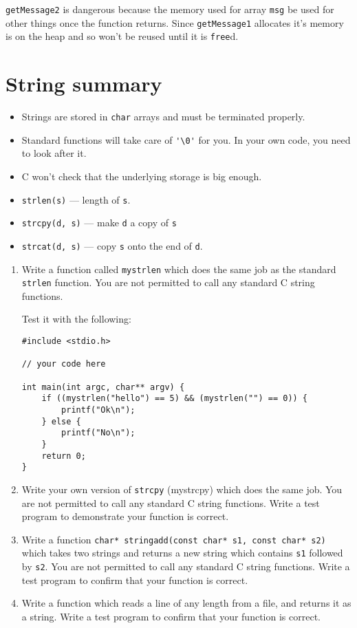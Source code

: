 \texttt{getMessage2} is dangerous because the memory used for array \texttt{msg} be used for other things once the function returns.
Since \texttt{getMessage1} allocates it's memory is on the heap and so won't be reused until it is \texttt{free}d.

\section*{String summary}
\begin{itemize}
 \item Strings are stored in \texttt{char} arrays and must be terminated properly.
 \item Standard functions will take care of \lstinline!'\0'! for you. In your own code, you need to look after it.
 \item C won't check that the underlying storage is big enough.
 \item \texttt{strlen(s)} --- length of \texttt{s}.
 \item \texttt{strcpy(d, s)} --- make \texttt{d} a copy of \texttt{s}
 \item \texttt{strcat(d, s)} --- copy \texttt{s} onto the end of \texttt{d}.
\end{itemize}


\begin{exercise}

\begin{enumerate}
\item
Write a function called \texttt{mystrlen} which does the same job as the standard \texttt{strlen} function.
You are not permitted to call any standard C string functions.

Test it with the following:
\begin{lstlisting}[numbers=none]
#include <stdio.h>

// your code here

int main(int argc, char** argv) {
    if ((mystrlen("hello") == 5) && (mystrlen("") == 0)) {
        printf("Ok\n");
    } else {
        printf("No\n");
    }
    return 0;
}
\end{lstlisting}

\item Write your own version of \texttt{strcpy} (mystrcpy) which does the same job.
You are not permitted to call any standard C string functions.
Write a test program to demonstrate your function is correct.

\item Write a function \lstinline!char* stringadd(const char* s1, const char* s2)! which takes two strings and 
returns a new string which contains \texttt{s1} followed by \texttt{s2}.
You are not permitted to call any standard C string functions.
Write a test program to confirm that your function is correct.

\item Write a function which reads a line of any length from a file, and returns it as a string.
Write a test program to confirm that your function is correct.
 
\end{enumerate}
 
\end{exercise}

